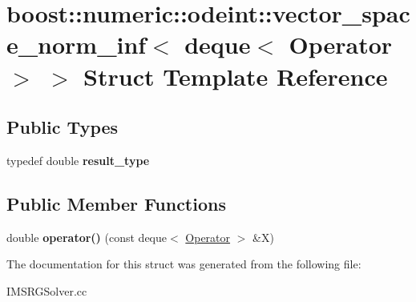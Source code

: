 \hypertarget{structboost_1_1numeric_1_1odeint_1_1vector__space__norm__inf_3_01deque_3_01Operator_01_4_01_4}{}\section{boost\+:\+:numeric\+:\+:odeint\+:\+:vector\+\_\+space\+\_\+norm\+\_\+inf$<$ deque$<$ Operator $>$ $>$ Struct Template Reference}
\label{structboost_1_1numeric_1_1odeint_1_1vector__space__norm__inf_3_01deque_3_01Operator_01_4_01_4}
\subsection*{Public Types}
\begin{DoxyCompactItemize}
\item 
\mbox{\label{structboost_1_1numeric_1_1odeint_1_1vector__space__norm__inf_3_01deque_3_01Operator_01_4_01_4_a7471e65d5fb919be93eb809eb06f0b3f}} 
typedef double {\bfseries result\+\_\+type}
\end{DoxyCompactItemize}
\subsection*{Public Member Functions}
\begin{DoxyCompactItemize}
\item 
\mbox{\label{structboost_1_1numeric_1_1odeint_1_1vector__space__norm__inf_3_01deque_3_01Operator_01_4_01_4_ac0908ecf46a9061d58d15c581d0ce8bd}} 
double {\bfseries operator()} (const deque$<$ \hyperlink{classOperator}{Operator} $>$ \&X)
\end{DoxyCompactItemize}


The documentation for this struct was generated from the following file\+:\begin{DoxyCompactItemize}
\item 
I\+M\+S\+R\+G\+Solver.\+cc\end{DoxyCompactItemize}
